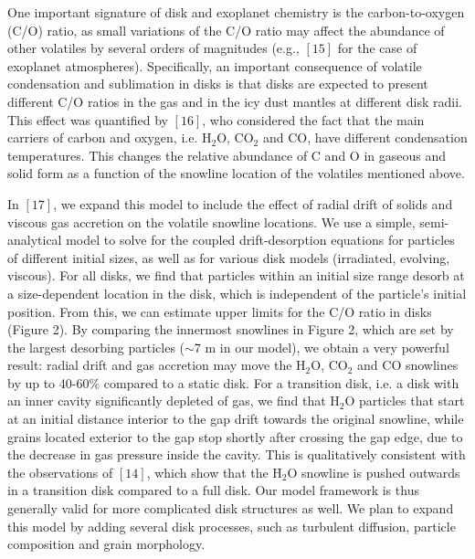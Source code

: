 \documentclass[12pt, letterpaper]{article}
\begin{document}
One important signature of disk and exoplanet chemistry is the carbon-to-oxygen (C/O) ratio, as small variations of the C/O ratio may affect the abundance of other volatiles by several orders of magnitudes (e.g., $[15]$ for the case of exoplanet atmospheres). Specifically, an important consequence of volatile condensation and sublimation in disks is that disks are expected to present different C/O ratios in the gas and in the icy dust mantles at different disk radii. This effect was quantified by $[16]$, who considered the fact that the main carriers of carbon and oxygen, i.e. H$_2$O, CO$_2$ and CO, have different condensation temperatures. This changes the relative abundance of C and O in gaseous and solid form as a function of the snowline location of the volatiles mentioned above. 

In $[17]$, we expand this model to include the effect of radial drift of solids and viscous gas accretion on the volatile snowline locations. We use a simple, semi-analytical model to solve for the coupled drift-desorption equations for particles of different initial sizes, as well as for various disk models (irradiated, evolving, viscous). For all disks, we find that particles within an initial size range desorb at a size-dependent location in the disk, which is independent of the particle's initial position. From this, we can estimate upper limits for the C/O ratio in disks (Figure 2). %
By comparing the innermost snowlines in Figure 2, which are set by the largest desorbing particles ($\sim$7 m in our model), we obtain a very powerful result: radial drift and gas accretion may move the H$_2$O, CO$_2$ and CO snowlines by up to 40-60\% compared to a static disk. For a transition disk, i.e. a disk with an inner cavity significantly depleted of gas, we find that H$_2$O particles that start at an initial distance interior to the gap drift towards the original snowline, while grains located exterior to the gap stop shortly after crossing the gap edge, due to the decrease in gas pressure inside the cavity. This is qualitatively consistent with the observations of $[14]$, which show that the H$_2$O snowline is pushed outwards in a transition disk compared to a full disk. Our model framework is thus generally valid for more complicated disk structures as well. We plan to expand this model by adding several disk processes, such as turbulent diffusion, particle composition and grain morphology.
\end{document}
